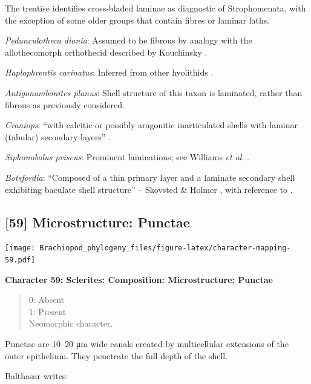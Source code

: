 \documentclass[]{book}
\theoremstyle{definition}
\theoremstyle{definition}
\theoremstyle{definition}
\theoremstyle{remark}
\begin{document}
The treatise \citep{Williams2000BrachiopodaLinguliformea} identifies
cross-bladed laminae as diagnostic of Strophomenata, with the exception
of some older groups that contain fibres or laminar laths.

\emph{Pedunculotheca diania}: Assumed to be fibrous by analogy with the
allothecomorph orthothecid described by Kouchinsky
\citeyearpar{Kouchinsky2000Skeletalmicrostructures}.

\emph{Haplophrentis carinatus}: Inferred from other hyolithids
\citep[e.g.][]{Moore2018Plywoodlike}.

\emph{Antigonambonites planus}: Shell structure of this taxon is
laminated, rather than fibrous as previously considered.

\emph{Craniops}: ``with calcitic or possibly aragonitic inarticulated
shells with laminar (tabular) secondary layers''
\citep{Williams2000BrachiopodaLinguliformea}.

\emph{Siphonobolus priscus}: Prominent laminations; see Williams
\emph{et al}. \citeyearpar{Williams2004Chemicostructure}.

\emph{Botsfordia}: ``Composed of a thin primary layer and a laminate
secondary shell exhibiting baculate shell structure'' -- Skovsted \&
Holmer \citeyearpar{Skovsted2005EarlyCambrian}, with reference to
\citet{Skovsted2003EarlyCambrian}.

\hypertarget{microstructure-punctae}{%
\subsection*{{[}59{]} Microstructure:
Punctae}\label{microstructure-punctae}}

\texttt{[image: Brachiopod\_phylogeny\_files/figure-latex/character-mapping-59.pdf]}

\textbf{Character 59: Sclerites: Composition: Microstructure: Punctae}

\begin{quote}
0: Absent\\
1: Present\\
Neomorphic character.
\end{quote}

Punctae are 10--20 μm wide canals created by multicellular extensions of
the outer epithelium. They penetrate the full depth of the shell.

Balthasar \citeyearpar{Balthasar2008iMummpikia} writes:
\end{document}
